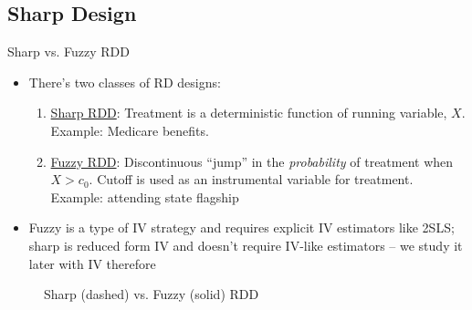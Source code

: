 \documentclass{beamer}
\begin{document}
\subsection{Sharp Design}

\begin{frame}{Sharp vs. Fuzzy RDD}
	
\begin{itemize}
\item There's two classes of RD designs:
	\begin{enumerate}
	\item \underline{Sharp RDD}: Treatment is a deterministic function of running variable, $X$. Example: Medicare benefits.  
	\item \underline{Fuzzy RDD}: Discontinuous ``jump'' in the \emph{probability} of treatment when $X>c_0$.  Cutoff is used as an instrumental variable for treatment.  Example: attending state flagship
	\end{enumerate}
\item Fuzzy is a type of IV strategy and requires explicit IV estimators like 2SLS; sharp is reduced form IV and doesn't require IV-like estimators -- we study it later with IV therefore
\end{itemize}	

\end{frame}	


\begin{frame}[plain]
\begin{figure}
\centering
{}
\caption{Sharp (dashed) vs. Fuzzy (solid) RDD}
\end{figure}

	

\end{frame}
\end{document}
